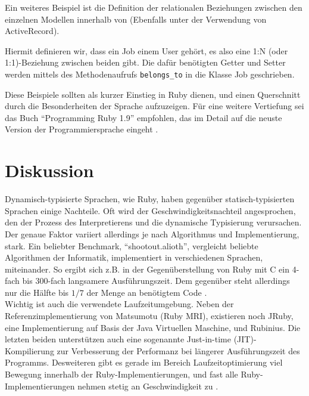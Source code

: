 Ein weiteres Beispiel ist die Definition der relationalen Beziehungen zwischen den einzelnen Modellen innerhalb von  (Ebenfalls unter der Verwendung von ActiveRecord).
\begin{ruby}[label=app/models/job.rb]
   
   
\end{ruby}

Hiermit definieren wir, dass ein Job einem User gehört, es also eine 1:N (oder 1:1)-Beziehung zwischen beiden gibt. Die dafür benötigten Getter und Setter werden mittels des Methodenaufrufs \texttt{belongs\_to} in die Klasse Job geschrieben.

Diese Beispiele sollten als kurzer Einstieg in Ruby dienen, und einen Querschnitt durch die Besonderheiten der Sprache aufzuzeigen.
Für eine weitere Vertiefung sei das Buch "`Programming Ruby 1.9"' empfohlen, das im Detail auf die neuste Version der Programmiersprache eingeht \citep{hunt_programming_2009}.



\section{Diskussion}

Dynamisch-typisierte Sprachen, wie Ruby, haben gegenüber statisch-typisierten Sprachen einige Nachteile. Oft wird der Geschwindigkeitsnachteil angesprochen, den der Prozess des Interpretierens und die dynamische Typisierung verursachen. 
Der genaue Faktor variiert allerdings je nach Algorithmus und Implementierung, stark. Ein beliebter Benchmark, "`shootout.alioth"', vergleicht beliebte Algorithmen der Informatik, implementiert in verschiedenen Sprachen, miteinander. So ergibt sich z.B. in der Gegenüberstellung von Ruby mit C ein 4-fach bis 300-fach langsamere Ausführungszeit. Dem gegenüber steht allerdings nur die Hälfte bis $1/7$ der Menge an benötigtem Code \citep{computer_language_benchmarks_game_ruby_2011}. \\
Wichtig ist auch die verwendete Laufzeitumgebung. Neben der Referenzimplementierung von Matsumotu (Ruby MRI), existieren noch JRuby, eine Implementierung auf Basis der Java Virtuellen Maschine, und Rubinius. Die letzten beiden unterstützen auch eine sogenannte Just-in-time (JIT)-Kompilierung zur Verbesserung der Performanz bei längerer Ausführungszeit des Programms. Desweiteren gibt es gerade im Bereich Laufzeitoptimierung viel Bewegung innerhalb der Ruby-Implementierungen, und fast alle Ruby-Implementierungen nehmen stetig an Geschwindigkeit zu \citep{antonio_cangiano_great_2010}.

